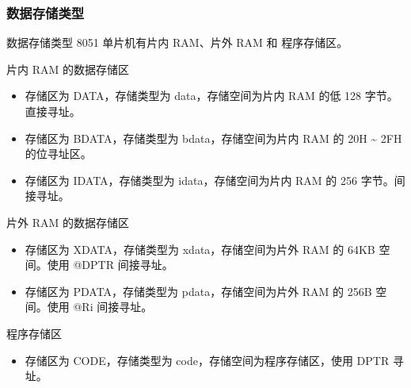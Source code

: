 \documentclass{beamer}
\begin{document}
\subsubsection{数据存储类型}

\begin{frame}{数据存储类型}
    8051 单片机有片内 RAM、片外 RAM 和 程序存储区。
\end{frame}

\begin{frame}{片内 RAM 的数据存储区}
    \begin{itemize}
        \item
            存储区为 DATA，存储类型为 data，存储空间为片内 RAM 的低 128
            字节。直接寻址。
        \item
            存储区为 BDATA，存储类型为 bdata，存储空间为片内 RAM 的 20H
            \textasciitilde{} 2FH 的位寻址区。
        \item
            存储区为 IDATA，存储类型为 idata，存储空间为片内 RAM 的 256
            字节。间接寻址。
    \end{itemize}
\end{frame}

\begin{frame}{片外 RAM 的数据存储区}
    \begin{itemize}
        \item
            存储区为 XDATA，存储类型为 xdata，存储空间为片外 RAM 的 64KB
            空间。使用 @DPTR 间接寻址。
        \item
            存储区为 PDATA，存储类型为 pdata，存储空间为片外 RAM 的 256B
            空间。使用 @Ri 间接寻址。
    \end{itemize}
\end{frame}

\begin{frame}{程序存储区}
    \begin{itemize}
        \item
            存储区为 CODE，存储类型为 code，存储空间为程序存储区，使用 DPTR
            寻址。
    \end{itemize}
\end{frame}
\end{document}
